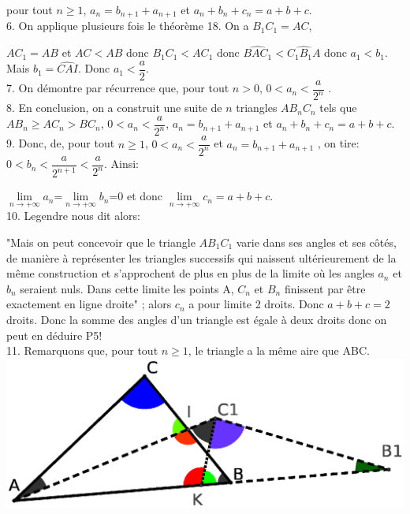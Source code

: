 \documentclass[a4paper, 12pt, twoside]{book}
\begin{document}
    pour tout $n\geq 1$, $a_{n}=b_{n+1}+a_{n+1}$ et $a_{n}+b_{n}+c_{n}=a+b+c$.\\
    
    6. On applique plusieurs fois le théorème 18. On a $B_{1}C_{1}=AC$,\
    
     $AC_{1}=AB$ et $AC<AB$ donc  $B_{1}C_{1}<AC_{1}$ donc $\hat{BAC_{1}}<\hat{C_{1}B_{1}A}$ donc $a_{1}<b_{1}$. Mais $b_{1}=\hat{CAI}$. Donc $a_{1}<\dfrac{a}{2}$.\\
     
     
     7. On démontre par récurrence que, pour tout $n>0$, $0<a_{n}<\dfrac{a}{2^{n}}$ .\\
     
     8. En conclusion, on a construit une suite de $n$ triangles $AB_{n}C_{n}$ tels que $AB_{n}\geq AC_{n}>BC_{n}$, $0<a_{n}<\dfrac{a}{2^{n}}$, $a_{n}=b_{n+1}+a_{n+1}$ et $a_{n}+b_{n}+c_{n}=a+b+c$.\\
     
     9. Donc, de, pour tout  $n\geq 1$, $ 0<a_{n}<\dfrac{a}{2^{n}}$ et  $a_{n}=b_{n+1}+a_{n+1}$ , on tire: $0<b_{n}< \dfrac{a}{2^{n+1}}< \dfrac{a}{2^{n}}$. Ainsi:\ 
     
     $\lim\limits_{n\rightarrow +\infty }a_{n}$=$\lim\limits_{n\rightarrow +\infty }b_{n}$=0 et donc  $\lim\limits_{n\rightarrow +\infty }c_{n}=a+b+c$.\\
    
     
     10. Legendre nous dit alors:
     
     
     
 "Mais on peut concevoir que le triangle $AB_{1}C_{1}$ varie dans ses angles et ses côtés, de
manière à représenter les triangles successifs qui naissent ultérieurement de la même
construction et s’approchent de plus en plus de la limite où les angles $a_{n}$ et $b_{n}$ seraient nuls.
Dans cette limite les points A, $C_{n}$ et $B_{n}$ finissent par
être exactement en ligne droite" ; alors $c_{n}$ a pour limite 2 droits. Donc $a+b+c=2$ droits. Donc la somme des angles d'un triangle est égale à deux droits donc on peut en déduire P5!\\
 
 11. Remarquons que, pour tout $n\geq1$, le triangle a la même aire que ABC.\\
 
 
   \includegraphics[scale=0.5]{figures/Legendre1.eps} \\
   
\end{document}
